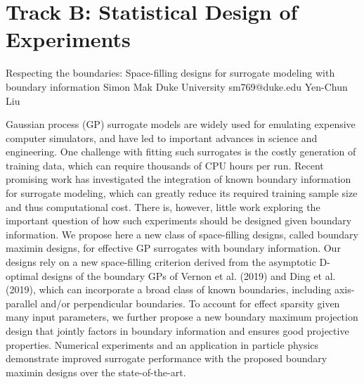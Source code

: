 \section{Track B: Statistical Design of Experiments}\newpage

\begin{talk}
  {Respecting the boundaries: Space-filling designs for surrogate modeling with boundary information}%
  {Simon Mak}%
  {Duke University}%
  {sm769@duke.edu}%
  {Yen-Chun Liu}%
  
    
   
Gaussian process (GP) surrogate models are widely used for emulating expensive computer simulators, and have led to important advances in science and engineering. One challenge with fitting such surrogates is the costly generation of training data, which can require thousands of CPU hours per run. Recent promising work has investigated the integration of known boundary information for surrogate modeling, which can greatly reduce its required training sample size and thus computational cost. There is, however, little work exploring the important question of how such experiments should be designed given boundary information. We propose here a new class of space-filling designs, called boundary maximin designs, for effective GP surrogates with boundary information. Our designs rely on a new space-filling criterion derived from the asymptotic D-optimal designs of the boundary GPs of Vernon et al. (2019) and Ding et al. (2019), which can incorporate a broad class of known boundaries, including axis-parallel and/or perpendicular boundaries. To account for effect sparsity given many input parameters, we further propose a new boundary maximum projection design that jointly factors in boundary information and ensures good projective properties. Numerical experiments and an application in particle physics demonstrate improved surrogate performance with the proposed boundary maximin designs over the state-of-the-art.
\medskip


\end{talk}

